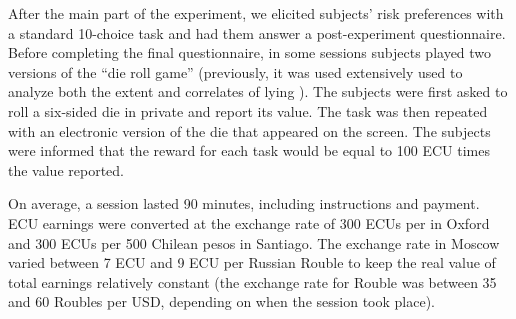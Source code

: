 \documentclass[12pt]{article}
\begin{document}
\par After the main part of the experiment, we elicited subjects' risk preferences with a standard 10-choice task \citep{Holtetal2002} and had them answer a post-experiment questionnaire. Before completing the final questionnaire, in some sessions subjects played two versions of the ``die roll game'' (previously, it was used extensively used to analyze both the extent and correlates of lying \citep{Fischbacheretal2013,Abeleretal2014,Gachter2016}). The subjects were first asked to roll a six-sided die in private and report its value. The task was then repeated with an electronic version of the die that appeared on the screen. The subjects were informed that the reward for each task would be equal to 100 ECU times the value reported.

\par On average, a session lasted 90 minutes, including instructions and payment. ECU earnings were converted at the exchange rate of 300 ECUs per  in Oxford and 300 ECUs per 500 Chilean pesos in Santiago. The exchange rate in Moscow varied between 7 ECU and 9 ECU per Russian Rouble to keep the real value of total earnings relatively constant (the exchange rate for Rouble was between 35 and 60 Roubles per USD, depending on when the session took place).
\end{document}
